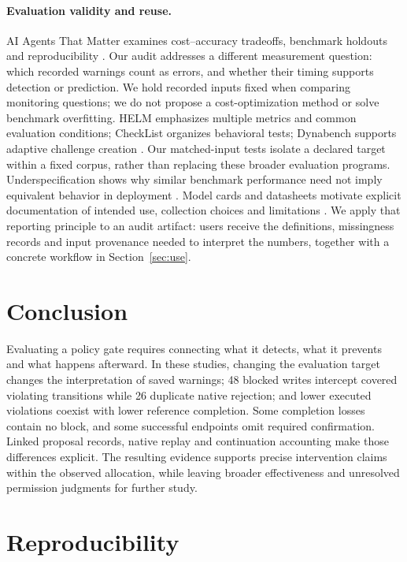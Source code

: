 \paragraph{Evaluation validity and reuse.}
AI Agents That Matter examines cost--accuracy tradeoffs, benchmark holdouts and reproducibility \citep{kapoor2025agents}. Our audit addresses a different measurement question: which recorded warnings count as errors, and whether their timing supports detection or prediction. We hold recorded inputs fixed when comparing monitoring questions; we do not propose a cost-optimization method or solve benchmark overfitting. HELM emphasizes multiple metrics and common evaluation conditions; CheckList organizes behavioral tests; Dynabench supports adaptive challenge creation \citep{liang2022helm,ribeiro2020checklist,kiela2021dynabench}. Our matched-input tests isolate a declared target within a fixed corpus, rather than replacing these broader evaluation programs. Underspecification shows why similar benchmark performance need not imply equivalent behavior in deployment \citep{damour2022underspecification}. Model cards and datasheets motivate explicit documentation of intended use, collection choices and limitations \citep{mitchell2019modelcards,gebru2021datasheets}. We apply that reporting principle to an audit artifact: users receive the definitions, missingness records and input provenance needed to interpret the numbers, together with a concrete workflow in Section~\ref{sec:use}.

\section{Conclusion}\label{conclusion}

Evaluating a policy gate requires connecting what it detects, what it
prevents and what happens afterward. In these studies, changing the
evaluation target changes the interpretation of saved warnings; 48
blocked writes intercept covered violating transitions while 26
duplicate native rejection; and lower executed violations coexist with
lower reference completion. Some completion losses contain no block, and
some successful endpoints omit required confirmation. Linked proposal
records, native replay and continuation accounting make those
differences explicit. The resulting evidence supports precise
intervention claims within the observed allocation, while leaving
broader effectiveness and unresolved permission judgments for further
study.

\section*{Reproducibility}\label{reproducibility}


